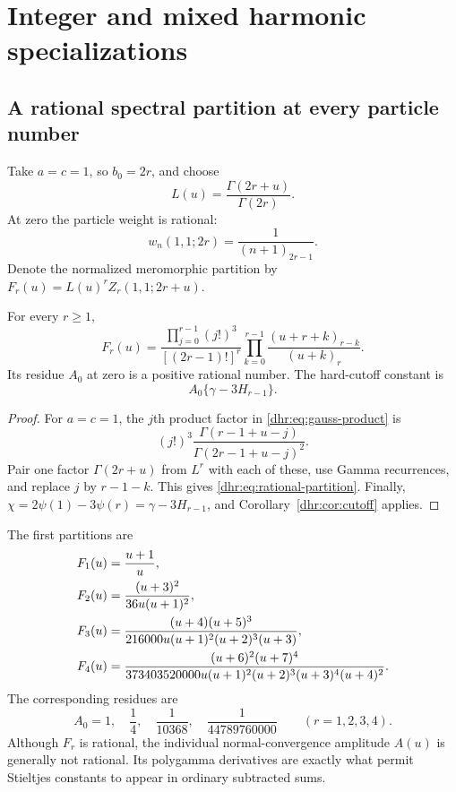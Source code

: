 \section{Integer and mixed harmonic specializations}
\label{dhr:sec:harmonic}

\subsection{A rational spectral partition at every particle number}
Take $a=c=1$, so $b_0=2r$, and choose
\begin{equation}\label{dhr:eq:integer-normalization}
 L(u)=\frac{\Gamma(2r+u)}{\Gamma(2r)}.
\end{equation}
At zero the particle weight is rational:
\[
 w_n(1,1;2r)=\frac1{(n+1)_{2r-1}}.
\]
Denote the normalized meromorphic partition by
$F_r(u)=L(u)^rZ_r(1,1;2r+u)$.

\begin{proposition}
\label{dhr:prop:rational-partition}
For every $r\geq1$,
\begin{equation}\label{dhr:eq:rational-partition}
 \boxed{F_r(u)=
 \frac{\displaystyle\prod_{j=0}^{r-1}(j!)^3}{[(2r-1)!]^r}
 \prod_{k=0}^{r-1}\frac{(u+r+k)_{r-k}}{(u+k)_r}.}
\end{equation}
Its residue $A_0$ at zero is a positive rational number. The hard-cutoff
constant is
\begin{equation}\label{dhr:eq:integer-cutoff}
 A_0\{\gamma-3H_{r-1}\}.
\end{equation}
\end{proposition}
\begin{proof}
For $a=c=1$, the $j$th product factor in
\eqref{dhr:eq:gauss-product} is
\[
 (j!)^3\frac{\Gamma(r-1+u-j)}{\Gamma(2r-1+u-j)^2}.
\]
Pair one factor $\Gamma(2r+u)$ from $L^r$ with each of these,
use Gamma recurrences, and replace $j$ by $r-1-k$.
This gives \eqref{dhr:eq:rational-partition}. Finally,
$\chi=2\psi(1)-3\psi(r)=\gamma-3H_{r-1}$, and
Corollary~\ref{dhr:cor:cutoff} applies.
\end{proof}

The first partitions are
\begin{align}
 F_1(u)&=\frac{u+1}{u},\notag\\
 F_2(u)&=\frac{(u+3)^2}{36u(u+1)^2},\notag\\
 F_3(u)&=\frac{(u+4)(u+5)^3}
 {216000u(u+1)^2(u+2)^3(u+3)},\notag\\
 F_4(u)&=\frac{(u+6)^2(u+7)^4}
 {373403520000u(u+1)^2(u+2)^3(u+3)^4(u+4)^2}.
 \label{dhr:eq:small-partitions}
\end{align}
The corresponding residues are
\begin{equation}\label{dhr:eq:small-residues}
 A_0=1,\quad\frac14,\quad\frac1{10368},\quad
 \frac1{44789760000}\qquad(r=1,2,3,4).
\end{equation}
Although $F_r$ is rational, the individual normal-convergence amplitude
$A(u)$ is generally not rational. Its polygamma derivatives are exactly
what permit Stieltjes constants to appear in ordinary subtracted sums.

